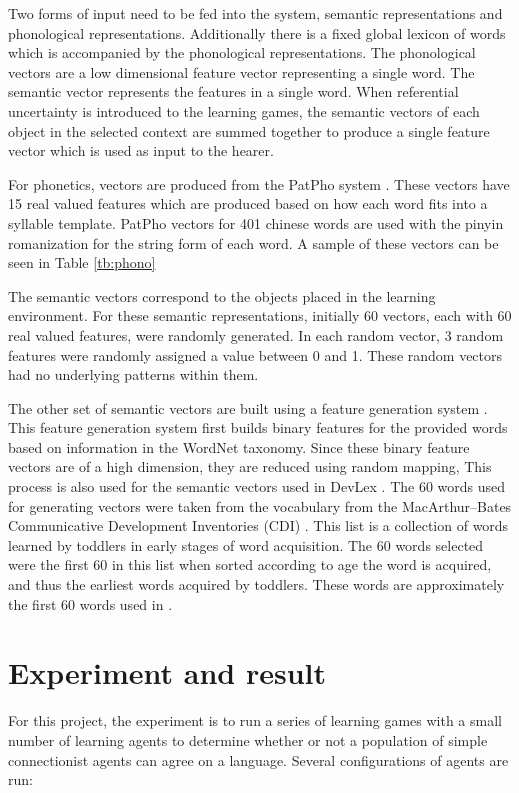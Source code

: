 \documentclass[a4paper,11pt]{article}
\begin{document}
Two forms of input need to be fed into the system, semantic representations and
phonological representations.  Additionally there is a fixed global lexicon of words
which is accompanied by the phonological representations.  The phonological
vectors are a low dimensional feature vector representing a single word.  The
semantic vector represents the features in a single word.  When referential
uncertainty is introduced to the learning games, the semantic vectors of each
object in the selected context are summed together to produce a single feature
vector which is used as input to the hearer.

For phonetics,
vectors are produced from the PatPho system \cite{LiPatPho}.  These vectors have 15
real valued features which are produced based on how each word fits into a
syllable template.  PatPho vectors for 401 chinese words are used with the
pinyin romanization for the string form of each word.  A sample of these vectors
can be seen in Table \ref{tb:phono}

The semantic vectors correspond to the objects placed in the learning environment.
For these semantic representations, initially 60 vectors, each with 60 real valued
features, were randomly generated.  In each random vector, 3 random features were
randomly assigned a value between 0 and 1.  These random vectors had no underlying
patterns within them.

The other set of semantic vectors are built using a feature generation system
\cite{HarmWordNetFeature}.  This feature generation system first builds binary
features for the provided words based on information in the WordNet taxonomy.
Since these binary feature vectors are of a high dimension, they are reduced
using random mapping, This process is also used for the semantic vectors used in
DevLex \cite{LiDevLex}.  The 60 words used for generating vectors were taken
from the vocabulary from the MacArthur–Bates Communicative Development
Inventories (CDI) \cite{DaleCDI}.  This list is a collection of words learned by
toddlers in early stages of word acquisition.  The 60 words selected were the
first 60 in this list when sorted according to age the word is acquired, and
thus the earliest words acquired by toddlers.  These words are approximately the
first 60 words used in \cite{LiDevLex}.

\section{Experiment and result}
For this project, the experiment is to run a series of learning games with a
small number of learning agents to determine whether or not a population of simple connectionist
agents can agree on a language.  Several configurations of agents are run:
\end{document}
